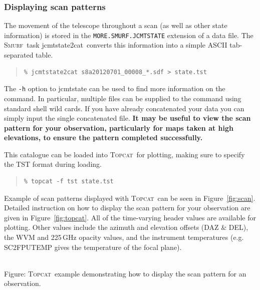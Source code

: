 \documentclass[twoside,11pt]{article}
\newcommand{\htmladdnormallink}[2]{#1}
\newcommand{\htmladdimg}[1]{}
\newcommand{\xref}[3]{#1}
\newcommand{\xlabel}[1]{}
\renewcommand{\_}{\texttt{\symbol{95}}}
\newenvironment{myquote}{\begin{quote}\begin{small}}{\end{small}\end{quote}}
\newcommand{\smurf}{\xref{\textsc{Smurf}}{sun258}{}}
\newcommand{\topcat}{\htmladdnormallink{\textsc{Topcat}}{http://www.starlink.ac.uk/topcat}}
\newcommand{\task}[1]{\textsf{#1}}
\newcommand{\jcmtstate}{\xref{\task{jcmtstate2cat}}{sun258}{JCMTSTATE2CAT}}
\begin{document}
\subsubsection{\xlabel{scan_pat}Displaying scan patterns}
\label{sec:scan}

The movement of the telescope throughout a scan (as well as other
state information) is stored in the \texttt{MORE.SMURF.JCMTSTATE}
extension of a data file. The \smurf\ task \jcmtstate\ converts this
information into a simple ASCII tab-separated table.

\begin{myquote}
\begin{verbatim}
% jcmtstate2cat s8a20120701_00008_*.sdf > state.tst
\end{verbatim}
\end{myquote}

The \texttt{-h} option to \task{jcmtstate} can be used to find more
information on the command. In particular, multiple files can be supplied
to the command using standard shell wild cards. If you have already
concatenated your data you can simply input the single concatenated
file. \textbf{It may be useful to view the scan pattern for your
observation, particularly for maps taken at high elevations, to ensure
the pattern completed successfully.}

This catalogue can be loaded into \topcat\ for plotting, making sure
to specify the TST format during loading.

\begin{myquote}
\begin{verbatim}
% topcat -f tst state.tst
\end{verbatim}
\end{myquote}

Example of scan patterns displayed with \topcat\ can be seen in
Figure~\ref{fig:scan}. Detailed instruction on how to display the scan
pattern for your observation are given in Figure~\ref{fig:topcat}. All
of the time-varying header values are available for plotting.  Other
values include the azimuth and elevation offsets (DAZ \& DEL), the WVM
and 225\,GHz opacity values, and the instrument temperatures (e.g.
SC2\_FPUTEMP gives the temperature of the focal plane).

\begin{htmlonly}
 \label{fig:topcat} \htmladdimg{sc21_topcat_example.png}
 \\
 Figure: \topcat\ example demonstrating how to display the scan
 pattern for an observation.\\ \\
\end{htmlonly}
\end{document}
